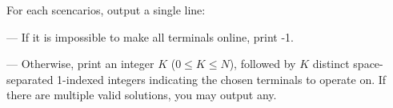 For each scencarios, output a single line:


--- If it is impossible to make all terminals online, print -1.


--- Otherwise, print an integer $K$ ($0 \le K \le N$), followed by $K$ distinct space-separated 1-indexed integers indicating the chosen terminals to operate on. If there are multiple valid solutions, you may output any.